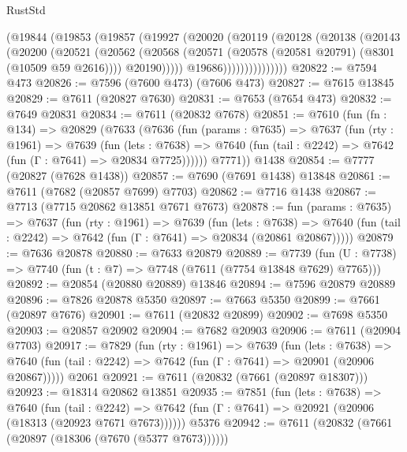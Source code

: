 \begin{lexlean}{RustStd}
\begin{coremodule}
{\begin{coremodule}
{{{{{{{{{{{{{{{{{{{{{{{{{{{{{{{{{{                  (@19844
                    (@19853
                      (@19857
                        (@19927
                          (@20020
                            (@20119
                              (@20128
                                (@20138
                                  (@20143
                                    (@20200
                                      (@20521
                                        (@20562
                                          (@20568
                                            (@20571
                                              (@20578 (@20581 @20791) (@8301 (@10509 @59 @2616))))
                                            @20190)))))
                                  @19686)))))))))))))))
@20822 := @7594 @473
@20826 := @7596 (@7600 @473) (@7606 @473)
@20827 := @7615 @13845
@20829 := @7611 (@20827 @7630)
@20831 := @7653 (@7654 @473)
@20832 := @7649 @20831
@20834 := @7611 (@20832 @7678)
@20851 := @7610
    (fun (fn : @134) =>
    @20829
      (@7633
        (@7636
          (fun (params : @7635) =>
          @7637
            (fun (rty : @1961) =>
            @7639
              (fun (lets : @7638) =>
              @7640 (fun (tail : @2242) => @7642 (fun (Γ : @7641) => @20834 @7725))))))
        @7771))
    @1438
@20854 := @7777 (@20827 (@7628 @1438))
@20857 := @7690 (@7691 @1438) @13848
@20861 := @7611 (@7682 (@20857 @7699) @7703)
@20862 := @7716 @1438
@20867 := @7713 (@7715 @20862 @13851 @7671 @7673)
@20878 := fun (params : @7635) =>
  @7637
    (fun (rty : @1961) =>
    @7639
      (fun (lets : @7638) =>
      @7640 (fun (tail : @2242) => @7642 (fun (Γ : @7641) => @20834 (@20861 @20867)))))
@20879 := @7636 @20878
@20880 := @7633 @20879
@20889 := @7739
    (fun (U : @7738) => @7740 (fun (t : @7) => @7748 (@7611 (@7754 @13848 @7629) @7765)))
@20892 := @20854 (@20880 @20889) @13846
@20894 := @7596 @20879 @20889
@20896 := @7826 @20878 @5350
@20897 := @7663 @5350
@20899 := @7661 (@20897 @7676)
@20901 := @7611 (@20832 @20899)
@20902 := @7698 @5350
@20903 := @20857 @20902
@20904 := @7682 @20903
@20906 := @7611 (@20904 @7703)
@20917 := @7829
    (fun (rty : @1961) =>
    @7639
      (fun (lets : @7638) =>
      @7640 (fun (tail : @2242) => @7642 (fun (Γ : @7641) => @20901 (@20906 @20867)))))
    @2061
@20921 := @7611 (@20832 (@7661 (@20897 @18307)))
@20923 := @18314 @20862 @13851
@20935 := @7851
    (fun (lets : @7638) =>
    @7640
      (fun (tail : @2242) =>
      @7642 (fun (Γ : @7641) => @20921 (@20906 (@18313 (@20923 @7671 @7673))))))
    @5376
@20942 := @7611 (@20832 (@7661 (@20897 (@18306 (@7670 (@5377 @7673))))))
}}}}}}}}}}}}}}}}}}}}}}}}}}}}}}}}}}
\end{coremodule}}
\end{coremodule}
\end{lexlean}
